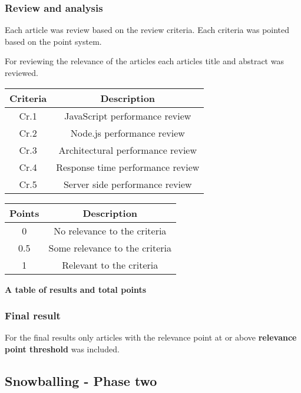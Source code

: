 \subsubsection{Review and analysis}
Each article was review based on the review criteria. Each criteria was pointed based on the point system.

For reviewing the relevance of the articles each articles title and abstract was reviewed.

\begin{flushleft}
\begin{tabular}{|c c|} 
 \hline
 Criteria & Description \\ [0.5ex] 
 \hline
  Cr.1 & JavaScript performance review  \\ 
  \hline
  Cr.2 & Node.js performance review  \\ 
  \hline
  Cr.3 & Architectural performance review  \\ 
  \hline
  Cr.4 & Response time performance review  \\ 
  \hline
  Cr.5 & Server side performance review  \\ 
  \hline
\end{tabular}
\end{flushleft}


\begin{flushleft}
\begin{tabular}{|c c|} 
 \hline
 Points & Description \\ [0.5ex] 
 \hline
  0 & No relevance to the criteria  \\ 
 \hline
  0.5 & Some relevance to the criteria \\ 
 \hline
 1 & Relevant to the criteria \\ 
 \hline
\end{tabular}
\end{flushleft}

\textbf{A table of results and total points}

\subsubsection{Final result}
For the final results only articles with the relevance point at or above \textbf{relevance point threshold} was included.

\subsection{Snowballing - Phase two}

